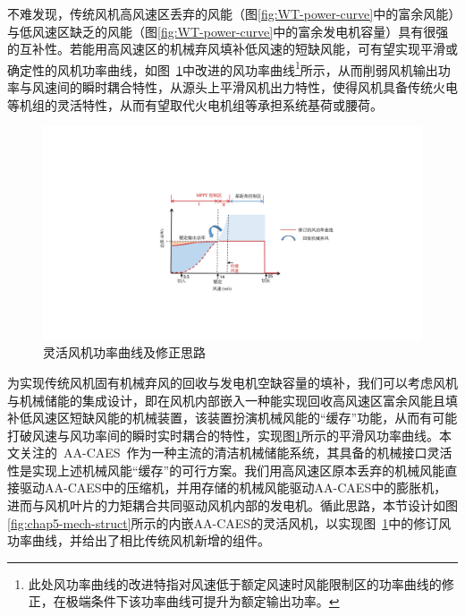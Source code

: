 不难发现，传统风机高风速区丢弃的风能（图\ref{fig:WT-power-curve}中的富余风能）与低风速区缺乏的风能（图\ref{fig:WT-power-curve}中的富余发电机容量）具有很强的互补性。若能用高风速区的机械弃风填补低风速的短缺风能，可有望实现平滑或确定性的风机功率曲线，如图~\ref{fig:CA-WT-power-curve}中改进的风功率曲线\footnote{此处风功率曲线的改进特指对风速低于额定风速时风能限制区的功率曲线的修正，在极端条件下该功率曲线可提升为额定输出功率。}所示，从而削弱风机输出功率与风速间的瞬时耦合特性，从源头上平滑风机出力特性，使得风机具备传统火电等机组的灵活特性，从而有望取代火电机组等承担系统基荷或腰荷。

\begin{figure}[H] %
  \centering
  \includegraphics[scale=0.72]{figures/Chap5-2-CA-WT-Power-Curve-V4.pdf}
  \caption{灵活风机功率曲线及修正思路}
  \label{fig:CA-WT-power-curve}
\end{figure}


为实现传统风机固有机械弃风的回收与发电机空缺容量的填补，我们可以考虑风机与机械储能的集成设计，即在风机内部嵌入一种能实现回收高风速区富余风能且填补低风速区短缺风能的机械装置，该装置扮演机械风能的“缓存”功能，从而有可能打破风速与风功率间的瞬时实时耦合的特性，实现图\ref{fig:CA-WT-power-curve}所示的平滑风功率曲线。本文关注的~AA-CAES~作为一种主流的清洁机械储能系统，其具备的机械接口灵活性是实现上述机械风能“缓存”的可行方案。我们用高风速区原本丢弃的机械风能直接驱动AA-CAES中的压缩机，并用存储的机械风能驱动AA-CAES中的膨胀机，进而与风机叶片的力矩耦合共同驱动风机内部的发电机。循此思路，本节设计如图\ref{fig:chap5-mech-struct}所示的内嵌AA-CAES的灵活风机，以实现图~\ref{fig:CA-WT-power-curve}中的修订风功率曲线，并给出了相比传统风机新增的组件。

